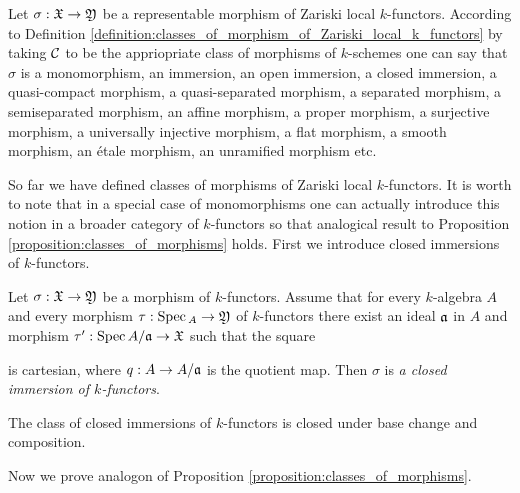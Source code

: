\begin{remark}\label{remark:various_classes_of_morphisms}
Let $\sigma:{\mathfrak X}\rightarrow {\mathfrak Y}$ be a representable morphism of Zariski local $k$-functors. According to Definition \ref{definition:classes_of_morphism_of_Zariski_local_k_functors} by taking ${\mathcal C}$ to be the appriopriate class of morphisms of $k$-schemes one can say that $\sigma$ is a monomorphism, an immersion, an open immersion, a closed immersion, a quasi-compact morphism, a quasi-separated morphism, a separated morphism, a semiseparated morphism, an affine morphism, a proper morphism, a surjective morphism, a universally injective morphism, a flat morphism, a smooth morphism, an {\'e}tale morphism, an unramified morphism etc.
\end{remark}
\noindent
So far we have defined classes of morphisms of Zariski local $k$-functors. It is worth to note that in a special case of monomorphisms one can actually introduce this notion in a broader category of $k$-functors so that analogical result to Proposition \ref{proposition:classes_of_morphisms} holds. First we introduce closed immersions of $k$-functors.

\begin{definition}
Let $\sigma:{\mathfrak X}\rightarrow {\mathfrak Y}$ be a morphism of $k$-functors. Assume that for every $k$-algebra $A$ and every morphism $\tau:\mathrm{Spec}\,_A\rightarrow {\mathfrak Y}$ of $k$-functors there exist an ideal $\mathfrak{a}$ in $A$ and morphism $\tau':\mathrm{Spec}\, A/\mathfrak{a} \rightarrow {\mathfrak X}$ such that the square
\begin{center}
\end{center}
is cartesian, where $q:A\rightarrow A/\mathfrak{a}$ is the quotient map. Then $\sigma$ is \textit{a closed immersion of $k$-functors}.
\end{definition}

\begin{fact}\label{fact:closed_immersions_closed_under_base_change_and_composition}
The class of closed immersions of $k$-functors is closed under base change and composition.
\end{fact}
\noindent
Now we prove analogon of Proposition \ref{proposition:classes_of_morphisms}.

